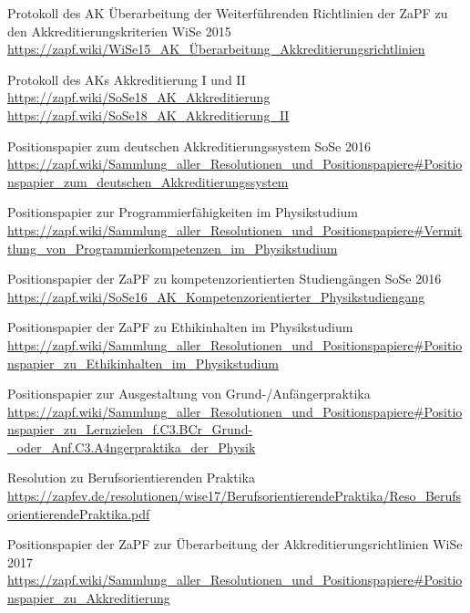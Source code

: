 \documentclass[a4paper]{scrartcl}
\begin{document}
\begin{thebibliography}{999}
 Protokoll des AK Überarbeitung der Weiterführenden Richtlinien der ZaPF zu den Akkreditierungskriterien WiSe 2015\\
\url{https://zapf.wiki/WiSe15_AK_Überarbeitung_Akkreditierungsrichtlinien}

 Protokoll des AKs Akkreditierung I und II\\
\url{https://zapf.wiki/SoSe18_AK_Akkreditierung}\\
\url{https://zapf.wiki/SoSe18_AK_Akkreditierung_II}

 Positionspapier zum deutschen Akkreditierungssystem SoSe 2016\\
\url{https://zapf.wiki/Sammlung_aller_Resolutionen_und_Positionspapiere#Positionspapier_zum_deutschen_Akkreditierungssystem}

 Positionspapier zur Programmierfähigkeiten im Physikstudium\\
\url{https://zapf.wiki/Sammlung_aller_Resolutionen_und_Positionspapiere#Vermittlung_von_Programmierkompetenzen_im_Physikstudium}

 Positionspapier der ZaPF zu kompetenzorientierten Studiengängen SoSe 2016\\
\url{https://zapf.wiki/SoSe16_AK_Kompetenzorientierter_Physikstudiengang}

 Positionspapier der ZaPF zu Ethikinhalten im Physikstudium\\
\url{https://zapf.wiki/Sammlung_aller_Resolutionen_und_Positionspapiere#Positionspapier_zu_Ethikinhalten_im_Physikstudium}

 Positionspapier zur Ausgestaltung von Grund-/Anfängerpraktika\\
\url{https://zapf.wiki/Sammlung_aller_Resolutionen_und_Positionspapiere#Positionspapier_zu_Lernzielen_f.C3.BCr_Grund-_oder_Anf.C3.A4ngerpraktika_der_Physik}

 Resolution zu Berufsorientierenden Praktika\\
\url{https://zapfev.de/resolutionen/wise17/BerufsorientierendePraktika/Reso_BerufsorientierendePraktika.pdf}

 Positionspapier der ZaPF zur Überarbeitung der Akkreditierungsrichtlinien WiSe 2017\\
\url{https://zapf.wiki/Sammlung_aller_Resolutionen_und_Positionspapiere#Positionspapier_zu_Akkreditierung}


\end{thebibliography}
\end{document}
